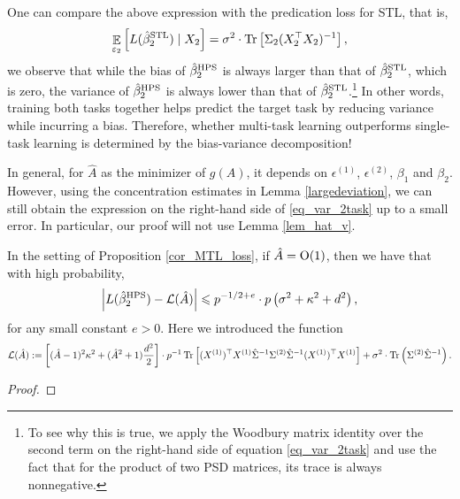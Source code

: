 One can compare the above expression with the predication loss for STL, that is,
\begin{align}
	\mathop{\mathbb{E}}_{\varepsilon_2}\left[ L(\hat{\beta}_2^{\textup{STL}}) \mid X_2 \right] = \sigma^2 \cdot \operatorname{Tr}\left[\Sigma_2 (X_2^{\top} X_2)^{-1}\right], \label{eq_var_stl}
\end{align}
we observe that while the bias of $\hat{\beta}_2^{\textup{HPS}}$ is always larger than that of $\hat{\beta}_2^{\textup{STL}}$, which is zero, the variance of $\hat{\beta}_2^{\textup{HPS}}$ is always lower than that of $\hat{\beta}_2^{\textup{STL}}$.\footnote{To see why this is true, we apply the Woodbury matrix identity over the second term on the right-hand side of equation \eqref{eq_var_2task} and use the fact that for the product of two PSD matrices, its trace is always nonnegative.}
In other words, training both tasks together helps predict the target task by reducing variance while incurring a bias.
Therefore, whether multi-task learning outperforms single-task learning is determined by the bias-variance decomposition!


In general, for $\hat A$ as  the minimizer of $g(A)$, it depends on $\epsilon^{(1)}$, $\epsilon^{(2)}$, $\beta_1$ and $\beta_2$. However, using the concentration estimates in Lemma \ref{largedeviation}, we can still obtain the expression on the right-hand side of \eqref{eq_var_2task} up to a small error. In particular, our proof will not use Lemma \ref{lem_hat_v}.

 \begin{claim}\label{claim_largedev2}
 In the setting of Proposition \ref{cor_MTL_loss}, if $\hat A=\operatorname{O}(1)$, then we have that with high probability,
$$\left| L(\hat{\beta}_2^{\textup{HPS}})- \mathcal L(\hat A)\right| \leqslant p^{-1/2+e}\cdot p\left(\sigma^2 +\kappa^2 +d^2 \right),$$
for any small constant $e>0$. Here we introduced the function
\begin{align*}
	\mathcal L(\hat A)	:=  \left[(\hat A-1)^2 \kappa^2 + (\hat A^2+1)\frac{d^2}2\right] \cdot p^{-1}\operatorname{Tr}\left[ (X^{(1)})^{\top}X^{(1)} \hat\Sigma^{-1} \Sigma^{(2)} \hat\Sigma^{-1} (X^{(1)})^{\top}X^{(1)} \right] +\sigma^2\cdot \operatorname{Tr}\left(\Sigma^{(2)}\hat \Sigma^{-1}\right).
\end{align*}
 \end{claim}
 \begin{proof}
 \end{proof}
 
